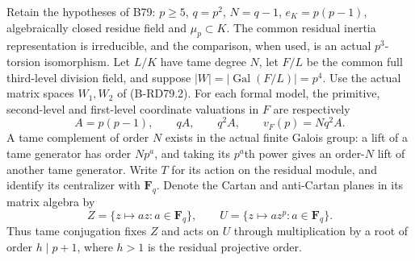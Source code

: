 Retain the hypotheses of B79: \(p\ge5\), \(q=p^2\), \(N=q-1\),
\(e_K=p(p-1)\), algebraically closed residue field and \(\mu_p\subset K\).
The common residual inertia representation is irreducible, and the
comparison, when used, is an actual \(p^3\)-torsion isomorphism.
Let \(L/K\) have tame degree \(N\), let \(F/L\) be the common full
third-level division field, and suppose \(|W|=|\operatorname{Gal}(F/L)|=p^4\).
Use the actual matrix spaces \(W_1,W_2\) of (B-RD79.2).
For each formal model, the primitive, second-level and first-level
coordinate valuations in \(F\) are respectively
\[
 A=p(p-1),\qquad qA,\qquad q^2A,
                 \qquad v_F(p)=Nq^2A.                 \tag{B-RD80.1}
\]
A tame complement of order \(N\) exists in the actual finite
Galois group: a lift of a tame generator has order \(Np^a\),
and taking its \(p^a\)th power gives an order-\(N\) lift of
another tame generator. Write \(T\) for its action on the residual module,
and identify its centralizer with \(\mathbf F_q\). Denote the
Cartan and anti-Cartan planes in its matrix algebra by
\[
 Z=\{z\mapsto az:a\in\mathbf F_q\},\qquad
 U=\{z\mapsto az^p:a\in\mathbf F_q\}.
\]
Thus tame conjugation fixes \(Z\) and acts on \(U\) through
multiplication by a root of order \(h\mid p+1\), where \(h>1\)
is the residual projective order.


